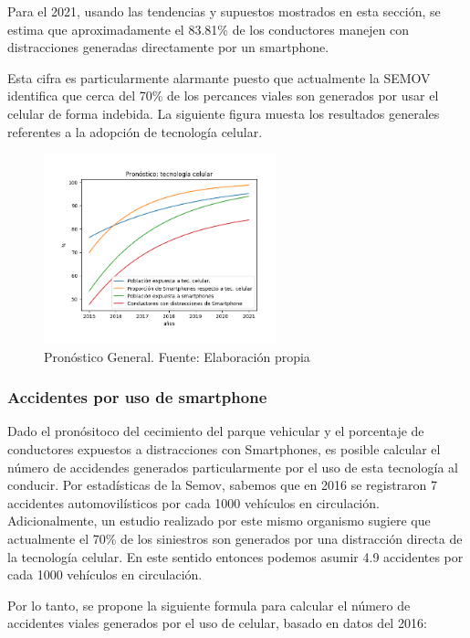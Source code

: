 \documentclass{article}
\begin{document}
Para el 2021, usando las tendencias y supuestos mostrados en esta sección, se estima
que aproximadamente el 83.81\% de los conductores manejen con distracciones generadas
directamente por un smartphone.

Esta cifra es particularmente alarmante puesto que actualmente la SEMOV identifica
que cerca del 70\% de los percances viales son generados por usar el celular de
forma indebida. La siguiente figura muesta los resultados generales referentes a la adopción de
tecnología celular.

	\begin{figure}[H]\centering
	\includegraphics[width=0.6\textwidth]{resources/img/smartphone_complete_forecast.png}
	\caption{\label{fig:compare_forecast} Pronóstico General. Fuente: Elaboración propia}
    \end{figure}

\subsubsection{Accidentes por uso de smartphone}

Dado el pronósitoco del cecimiento del parque vehicular y el porcentaje de conductores expuestos a
distracciones con Smartphones, es posible calcular el número de accidendes generados particularmente
por el uso de esta tecnología al conducir. Por estadísticas de la Semov, sabemos que en 2016 se registraron 7
accidentes automovilísticos por cada 1000 vehículos en circulación. Adicionalmente, un estudio realizado por este
mismo organismo sugiere que actualmente el 70\% de los siniestros son generados por una distracción directa de la
tecnología celular. En este sentido entonces podemos asumir 4.9 accidentes por cada 1000 vehículos en circulación.

Por lo tanto, se propone la siguiente formula para calcular el número de accidentes viales generados por el uso
de celular, basado en datos del 2016:
\end{document}
